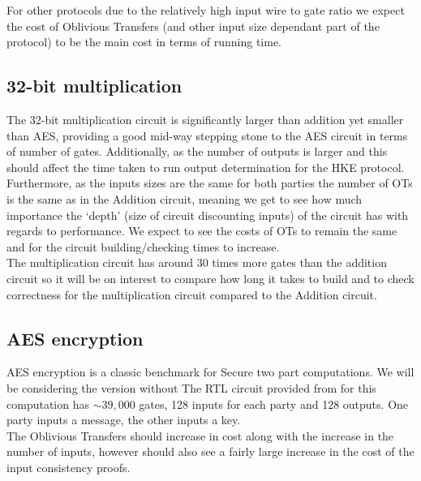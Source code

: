 \documentclass[ %
                    author={Nicholas Tutte},
                supervisor={Prof. Nigel Smart},
                    degree={MEng},
                     title={Secure Two Party Computation},
                  subtitle={A practical comparison of recent protocols},
                      type={Research - GG1K},
                      year={2015} ]{dissertation}
\begin{document}
				For other protocols due to the relatively high input wire to gate ratio we expect the cost of Oblivious Transfers (and other input size dependant part of the protocol) to be the main cost in terms of running time.

			\subsection{32-bit multiplication}

				The 32-bit multiplication circuit is significantly larger than addition yet smaller than AES, providing a good mid-way stepping stone to the AES circuit in terms of number of gates. Additionally, as the number of outputs is larger and this should affect the time taken to run output determination for the HKE protocol.\\

				Furthermore, as the inputs sizes are the same for both parties the number of OTs is the same as in the Addition circuit, meaning we get to see how much importance the `depth' (size of circuit discounting inputs) of the circuit has with regards to performance. We expect to see the costs of OTs to remain the same and for the circuit building/checking times to increase.\\
				
				The multiplication circuit has around $30$ times more gates than the addition circuit so it will be on interest to compare how long it takes to build and to check correctness for the multiplication circuit compared to the Addition circuit.

			\subsection{AES encryption}

				AES encryption is a classic benchmark for Secure two part computations. We will be considering the version without The RTL circuit provided from \cite{NigelCircuits} for this computation has $\sim 39,000$ gates, 128 inputs for each party and 128 outputs. One party inputs a message, the other inputs a key.\\

				The Oblivious Transfers should increase in cost along with the increase in the number of inputs, however should also see a fairly large increase in the cost of the input consistency proofs.
\end{document}
